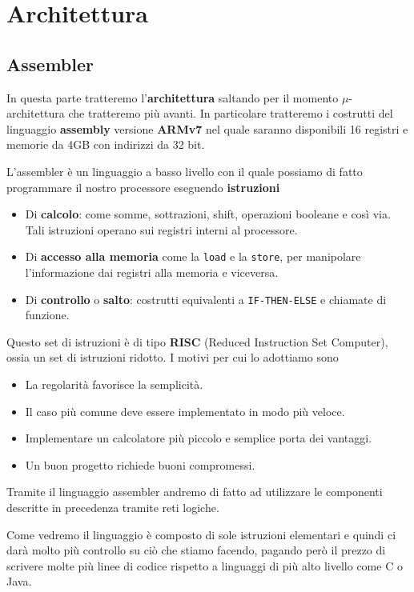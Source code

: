 \part{Architettura}

\chapter{Assembler}
In questa parte tratteremo l'\textbf{architettura} saltando per il momento $\mu$-architettura che
tratteremo più avanti. In particolare tratteremo i costrutti del linguaggio \textbf{assembly}
versione \textbf{ARMv7} nel quale saranno disponibili 16 registri e memorie da 4GB con indirizzi da
32 bit.

L'assembler è un linguaggio a basso livello con il quale possiamo di fatto programmare il nostro
processore eseguendo \textbf{istruzioni}
\begin{itemize}
	\item Di \textbf{calcolo}: come somme, sottrazioni, shift, operazioni booleane e così via. Tali
	      istruzioni operano sui registri interni al processore.
	\item Di \textbf{accesso alla memoria} come la \verb|load| e la \verb|store|, per manipolare
	      l'informazione dai registri alla memoria e viceversa.
	\item Di \textbf{controllo} o \textbf{salto}: costrutti equivalenti a \verb|IF-THEN-ELSE| e
	      chiamate di funzione.
\end{itemize}
Questo set di istruzioni è di tipo \textbf{RISC} (Reduced Instruction Set Computer), ossia un set
di istruzioni ridotto. I motivi per cui lo adottiamo sono
\begin{itemize}
	\item La regolarità favorisce la semplicità.
	\item Il caso più comune deve essere implementato in modo più veloce.
	\item Implementare un calcolatore più piccolo e semplice porta dei vantaggi.
	\item Un buon progetto richiede buoni compromessi.
\end{itemize}
Tramite il linguaggio assembler andremo di fatto ad utilizzare le componenti descritte in
precedenza tramite reti logiche.

Come vedremo il linguaggio è composto di sole istruzioni elementari e quindi ci darà molto più
controllo su ciò che stiamo facendo, pagando però il prezzo di scrivere molte più linee di codice
rispetto a linguaggi di più alto livello come C o Java.


